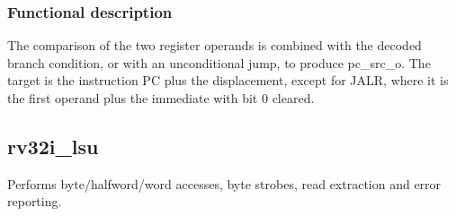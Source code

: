 \documentclass[11pt]{article}
\begin{document}
\subsubsection{Functional description}
\noindent The comparison of the two register operands is combined with the decoded branch condition, or with an unconditional jump, to produce pc\_src\_o. The target is the instruction PC plus the displacement, except for JALR, where it is the first operand plus the immediate with bit 0 cleared.\par\medskip

\subsection{rv32i\_lsu}
Performs byte/halfword/word accesses, byte strobes, read extraction and error reporting.
\end{document}
